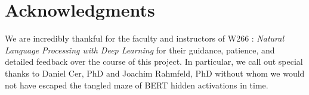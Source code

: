 \section*{Acknowledgments}

We are incredibly thankful for the faculty and instructors of W266 : \textit{Natural Language Processing with Deep Learning} for their guidance, patience, and detailed feedback over the course of this project. In particular, we call out special thanks to Daniel Cer, PhD and Joachim Rahmfeld, PhD without whom we would not have escaped the tangled maze of BERT hidden activations in time.